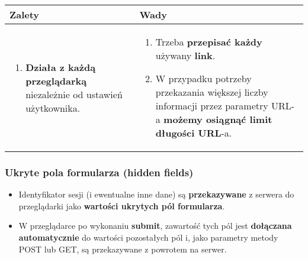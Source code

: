 \documentclass[../main.tex]{subfiles}
\begin{document}
    \begin{table}[H]
        \begin{center}
            \begin{tabular}{p{8cm} | p{8cm}}
                \textbf{Zalety} & \textbf{Wady}\\
                \hline
                \begin{enumerate}
                    \item \textbf{Działa z każdą przeglądarką} niezależnie od ustawień użytkownika.
                \end{enumerate}
                &
                \begin{enumerate}
                    \item Trzeba \textbf{przepisać każdy} używany \textbf{link}.
                    \item W przypadku potrzeby przekazania większej liczby informacji przez parametry URL-a \textbf{możemy osiągnąć limit długości URL}-a.
                \end{enumerate}\\
            \end{tabular}
        \end{center}
    \end{table}

    \subsubsection{Ukryte pola formularza (hidden fields)}
    \begin{itemize}
        \item Identyfikator sesji (i ewentualne inne dane) są \textbf{przekazywane} z serwera do przeglądarki jako \textbf{wartości ukrytych pól formularza}.
        \item W przeglądarce po wykonaniu \textbf{submit}, zawartość tych pól jest \textbf{dołączana automatycznie} do wartości pozostałych pól i, jako parametry metody POST lub
        GET, są przekazywane z powrotem na serwer.
    \end{itemize}
\end{document}
